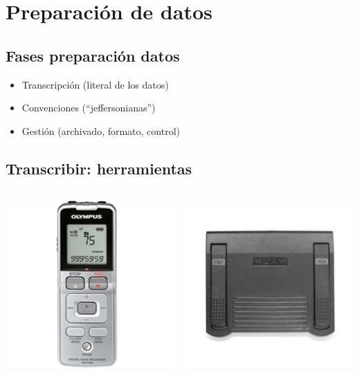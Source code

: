 \hypertarget{preparacion-datos}{%
\section{Preparación de datos}\label{preparacion-datos}}

\hypertarget{fases-preparacion-datos}{%
\subsection{Fases preparación datos}\label{fases-preparacion-datos}}

\begin{itemize}
\tightlist
\item
  Transcripción (literal de los datos)
\item
  Convenciones (``jeffersonianas'')
\item
  Gestión (archivado, formato, control)
\end{itemize}

\hypertarget{transcribir-herramientas}{%
\subsection{Transcribir: herramientas}\label{transcribir-herramientas}}

\begin{columns}[T]
\begin{column}{0.5\textwidth}
\includegraphics{imagenes-cuali/Grabadora.jpg}
\end{column}

\begin{column}{0.5\textwidth}
\includegraphics{imagenes-cuali/Pedal.jpg}
\end{column}
\end{columns}

